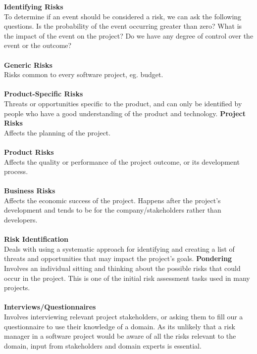 \documentclass[a4paper,10pt]{article}
\begin{document}
\newpage
\noindent \textcolor{BlueGreen}{\textbf{Identifying Risks}} \\
To determine if an event should be considered a risk, we can ask the following questions. Is the probability of the event occurring greater than zero? What is the impact of the event on the project? Do we have any degree of control over the event or the outcome? \\\\
\textbf{Generic Risks} \\
Risks common to every software project, eg. budget. \\\\
\textbf{Product-Specific Risks} \\
Threats or opportunities specific to the product, and can only be identified by people who have a good understanding of the product and technology. 
\noindent \textbf{Project Risks} \\
Affects the planning of the project. \\\\
\textbf{Product Risks}\\
Affects the quality or performance of the project outcome, or its development process. \\\\
\textbf{Business Risks}\\
Affects the economic success of the project. Happens after the project's development and tends to be for the company/stakeholders rather than developers. \\\\
\textcolor{BlueGreen}{\textbf{Risk Identification}}\\
Deals with using a systematic approach for identifying and creating a list of threats and opportunities that may impact the project's goals. 
\textbf{Pondering}\\
Involves an individual sitting and thinking about the possible risks that could occur in the project. This is one of the initial risk assessment tasks used in many projects. \\\\
\textbf{Interviews/Questionnaires}\\
Involves interviewing relevant project stakeholders, or asking them to fill our a questionnaire to use their knowledge of a domain. As its unlikely that a risk manager in a software project would be aware of all the risks relevant to the domain, input from stakeholders and domain experts is essential. \\\\
\end{document}
